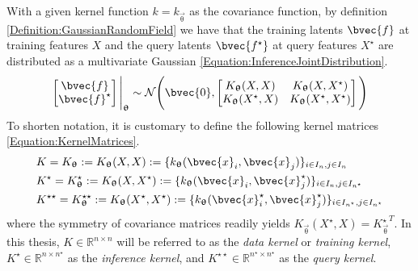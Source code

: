 				With a given kernel function $k = k_{\vec{\uptheta}}$ as the covariance function, by definition \ref{Definition:GaussianRandomField} we have that the training latents $\bvec{f}$ at training features $X$ and the query latents $\bvec{f^{\star}}$ at query features $X^{\star}$ are distributed as a multivariate Gaussian \eqref{Equation:InferenceJointDistribution}. \begin{equation}
					\begin{bmatrix}
						\bvec{f} \\ \bvec{f}^{\star}
					\end{bmatrix} \Bigg|_{\vec{\uptheta}}
					\sim \mathcal{N}\Bigg(\bvec{0}, \begin{bmatrix}
														K_{\vec{\uptheta}}(X, X) & K_{\vec{\uptheta}}(X, X^{\star}) \\
														K_{\vec{\uptheta}}(X^{\star}, X) & K_{\vec{\uptheta}}(X^{\star}, X^{\star}) \\
													\end{bmatrix}  \Bigg)
				\label{Equation:InferenceJointDistribution}
				\end{equation} To shorten notation, it is customary to define the following kernel matrices \eqref{Equation:KernelMatrices}. \begin{equation}
					\begin{aligned}
						& K = K_{\vec{\uptheta}} := K_{\vec{\uptheta}}(X, X) := \{k_{\vec{\uptheta}}(\bvec{x}_{i}, \bvec{x}_{j})\}_{i \in I_{n}, j \in I_{n}} \\
						& K^{\star} = K_{\vec{\uptheta}}^{\star} := K_{\vec{\uptheta}}(X, X^{\star}) := \{k_{\vec{\uptheta}}(\bvec{x}_{i}, \bvec{x}^{\star}_{j})\}_{i \in I_{n}, j \in I_{n^{\star}}} \\
						& K^{\star \star} = K_{\vec{\uptheta}}^{\star \star} := K_{\vec{\uptheta}}(X^{\star}, X^{\star}) := \{k_{\vec{\uptheta}}(\bvec{x}^{\star}_{i}, \bvec{x}^{\star}_{j})\}_{i \in I_{n^{\star}}, j \in I_{n^{\star}}}
					\end{aligned}
				\label{Equation:KernelMatrices}
				\end{equation} where the symmetry of covariance matrices readily yields $K_{\vec{\uptheta}}(X^{\star}, X) = {K_{\vec{\uptheta}}^{\star}}^{T}$. In this thesis, $K \in \mathbb{R}^{n \times n}$ will be referred to as the \textit{data kernel} or \textit{training kernel}, $K^{\star} \in \mathbb{R}^{n \times n^{\star}}$ as the \textit{inference kernel}, and $K^{\star \star} \in \mathbb{R}^{n^{\star} \times n^{\star}}$ as the \textit{query kernel}.
					
